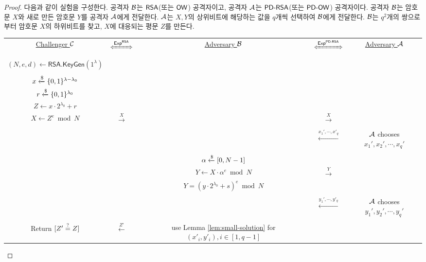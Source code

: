 \begin{proof}
    다음과 같이 실험을 구성한다. 공격자 $\mathcal{B}$는 $\textsf{RSA}$(또는 $\textsf{OW}$) 공격자이고,
    공격자 $\mathcal{A}$는 $\textsf{PD-RSA}$(또는 $\textsf{PD-OW}$) 공격자이다. 공격자 $\mathcal{B}$는 암호문
    $X$와 새로 만든 암호문 $Y$를 공격자 $\mathcal{A}$에게 전달한다. $\mathcal{A}$는 $X,Y$의
    상위비트에 해당하는 값을 $q$개씩 선택하여 $\mathcal{B}$에게 전달한다. $\mathcal{B}$는
    $q^2$개의 쌍으로부터 암호문 $X$의 하위비트를 찾고, $X$에 대응되는 평문 $Z$를 만든다.
    \begin{tcolorbox}[colback=white]
        \centering
        \begin{tabularx}{\linewidth}{CcCcC}
            \underline{Challenger $\mathcal{C}$} & $\xLeftrightarrow{\EXP^{\RSA}}$ & \underline{Adversary $\mathcal{B}$} & $\xLeftrightarrow{\EXP^{\PDRSA}}$ & \underline{Adversary $\mathcal{A}$} \\
            \\
            $(N, e, d) \gets \textsf{RSA.KeyGen}(1^{\lambda})$ & & & & \\
            \\
            $x \xleftarrow{\$} \{0, 1\}^{\lambda - \lambda_0}$ & & & & \\
            $r \xleftarrow{\$} \{0, 1\}^{\lambda_0}$ & & & & \\
            $Z \gets x \cdot 2^{\lambda_0} + r$ & & & & \\
            $X \gets Z^e \bmod N$ & $\xrightarrow{X}$ & & $\xrightarrow{X}$ & \\
            \\
            & & & $\xleftarrow{x_1', \cdots , x'_q}$ & $\mathcal{A}$ chooses $x_1', x_2', \cdots, x_q'$ \\
            \\
            & & $\alpha \xleftarrow{\$} [0, N-1]$ & & \\
            & & $Y \gets X \cdot \alpha^e \bmod N$ & $\xrightarrow{Y}$ & \\
            & & {\fontsize{7pt}{8.4pt}\selectfont $Y = (y \cdot 2^{\lambda_0} + s)^e \bmod N$} & & \\
            \\
            & & & $\xleftarrow{y_1', \cdots , y'_q}$ & $\mathcal{A}$ chooses $y_1', y_2', \cdots, y_q'$ \\
            \\
            Return $[Z' \overset{?}{=} Z]$ & $\xleftarrow{Z'}$ & use Lemma \ref{lem:small-solution} for $(x'_i, y'_i), i \in [1, q-1]$ & & \\
      \end{tabularx}
    \end{tcolorbox}


\end{proof}
